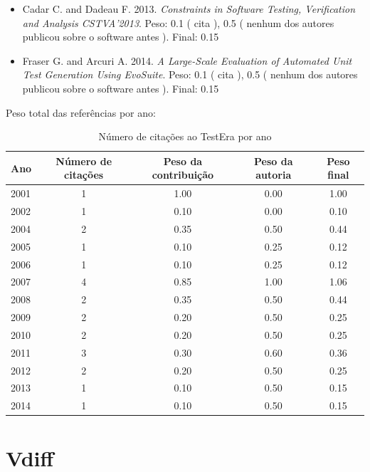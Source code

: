 \begin{itemize}
\item Cadar C. and Dadeau F.
      2013.
        \textit{ Constraints in Software Testing, Verification and Analysis CSTVA'2013}.
      Peso:
      0.1 (
          cita
      ),
      0.5 (
nenhum dos autores publicou sobre o software antes
      ).
      Final:
      0.15

\item Fraser G. and Arcuri A.
      2014.
        \textit{ A Large-Scale Evaluation of Automated Unit Test Generation Using EvoSuite}.
      Peso:
      0.1 (
          cita
      ),
      0.5 (
nenhum dos autores publicou sobre o software antes
      ).
      Final:
      0.15

\end{itemize}

Peso total das referências por ano:

\begin{table}[h]
\caption{Número de citações ao TestEra por ano}
\centering
\begin{tabular}{| l | c | c | c | c |}
  \hline
  Ano & Número de citações & Peso da contribuição & Peso da autoria & Peso final \\
  \hline
  2001
    & 1
    & 1.00
    & 0.00
    & 1.00 \\
  2002
    & 1
    & 0.10
    & 0.00
    & 0.10 \\
  2004
    & 2
    & 0.35
    & 0.50
    & 0.44 \\
  2005
    & 1
    & 0.10
    & 0.25
    & 0.12 \\
  2006
    & 1
    & 0.10
    & 0.25
    & 0.12 \\
  2007
    & 4
    & 0.85
    & 1.00
    & 1.06 \\
  2008
    & 2
    & 0.35
    & 0.50
    & 0.44 \\
  2009
    & 2
    & 0.20
    & 0.50
    & 0.25 \\
  2010
    & 2
    & 0.20
    & 0.50
    & 0.25 \\
  2011
    & 3
    & 0.30
    & 0.60
    & 0.36 \\
  2012
    & 2
    & 0.20
    & 0.50
    & 0.25 \\
  2013
    & 1
    & 0.10
    & 0.50
    & 0.15 \\
  2014
    & 1
    & 0.10
    & 0.50
    & 0.15 \\
  \hline
\end{tabular}
\end{table}


\section{Vdiff}


